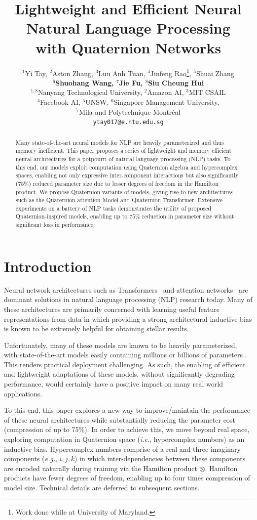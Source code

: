 \documentclass[11pt,a4paper]{article}
\title{Lightweight and Efficient Neural Natural Language Processing \\with Quaternion Networks}
\author{$^1$Yi Tay, $^2$Aston Zhang, $^3$Luu Anh Tuan, $^4$Jinfeng Rao\thanks{ \:\: Work done while at University of Maryland.}, $^5$Shuai Zhang \\ \textbf{$^6$Shuohang Wang, $^7$Jie Fu,  $^8$Siu Cheung Hui} \\
  $^{1,8}$Nanyang Technological University, $^2$Amazon AI, $^3$MIT CSAIL\\
  $^4$Facebook AI, $^5$UNSW, $^{6}$Singapore Management University,\\ $^7$Mila and Polytechnique Montr\'eal \\
   {\tt ytay017@e.ntu.edu.sg}
}
\date{}
\begin{document}
\maketitle
\begin{abstract}
Many state-of-the-art neural models for NLP are heavily parameterized and thus memory inefficient. This paper proposes a series of lightweight and memory efficient neural architectures for a potpourri of natural language processing (NLP) tasks. To this end, our models exploit computation using Quaternion algebra and hypercomplex spaces, enabling not only expressive inter-component interactions but also significantly ($75\%$) reduced parameter size due to lesser degrees of freedom in the Hamilton product. We propose Quaternion variants of models, giving rise to new architectures such as the Quaternion attention Model and Quaternion Transformer. Extensive experiments on a battery of NLP tasks  demonstrates the utility of proposed Quaternion-inspired models, enabling up to $75\%$ reduction in parameter size without significant loss in performance.
\end{abstract}

\section{Introduction}
Neural network architectures such as Transformers~\cite{vaswani2017attention,dehghani2018universal} and attention networks~\cite{parikh2016decomposable,seo2016bidirectional,bahdanau2014neural} are dominant solutions in natural language processing (NLP) research today. Many of these architectures are primarily concerned with learning useful feature representations from data in which providing a strong architectural inductive bias is known to be extremely helpful for obtaining stellar results.


Unfortunately, many of these models are known to be heavily parameterized, with state-of-the-art models easily containing millions or billions of parameters \cite{vaswani2017attention,radford2018improving,devlin2018bert,radford2019gpt2}. This renders practical deployment challenging. As such, the enabling of efficient and lightweight adaptations of these models, without significantly degrading performance, would certainly have a positive impact on many real world applications.

To this end, this paper explores a new way to improve/maintain the performance of these neural architectures while substantially reducing the parameter cost (compression of up to 75\%). In order to achieve this, we move beyond real space, exploring computation in Quaternion space (\emph{i.e.}, hypercomplex numbers) as an inductive bias. Hypercomplex numbers comprise of a real and three imaginary components (\emph{e.g.}, $i,j,k$) in which inter-dependencies between these components are encoded naturally during training via the Hamilton product $\otimes$. Hamilton products have fewer degrees of freedom, enabling up to four times compression of model size. Technical details are deferred to subsequent sections.
\end{document}
